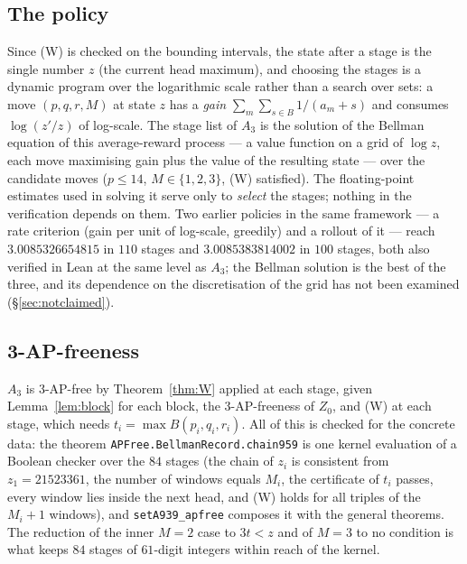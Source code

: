 \documentclass[11pt,a4paper]{article}
\theoremstyle{definition}
\theoremstyle{remark}
\newcommand{\Blk}{B}
\newcommand{\code}[1]{\texttt{#1}}
\begin{document}
\subsection{The policy}\label{sec:policy}

Since (W) is checked on the bounding intervals, the state after a stage is the single number $z$ (the current head maximum), and choosing the stages is a dynamic program over the logarithmic scale rather than a search over sets: a move $(p,q,r,M)$ at state $z$ has a \emph{gain} $\sum_m \sum_{s \in \Blk} 1/(a_m + s)$ and consumes $\log(z'/z)$ of log-scale. The stage list of $A_3$ is the solution of the Bellman equation of this average-reward process --- a value function on a grid of $\log z$, each move maximising gain plus the value of the resulting state --- over the candidate moves ($p \le 14$, $M \in \{1,2,3\}$, (W) satisfied). The floating-point estimates used in solving it serve only to \emph{select} the stages; nothing in the verification depends on them. Two earlier policies in the same framework --- a rate criterion (gain per unit of log-scale, greedily) and a rollout of it --- reach $3.0085326654815$ in $110$ stages and $3.0085383814002$ in $100$ stages, both also verified in Lean at the same level as $A_3$; the Bellman solution is the best of the three, and its dependence on the discretisation of the grid has not been examined (\S\ref{sec:notclaimed}).

\subsection{3-AP-freeness}\label{sec:apfree3}

$A_3$ is 3-AP-free by Theorem~\ref{thm:W} applied at each stage, given Lemma~\ref{lem:block} for each block, the 3-AP-freeness of $Z_0$, and (W) at each stage, which needs $t_i = \max \Blk(p_i,q_i,r_i)$. All of this is checked for the concrete data: the theorem \code{APFree.\allowbreak{}BellmanRecord.\allowbreak{}chain959} is one kernel evaluation of a Boolean checker over the $84$ stages (the chain of $z_i$ is consistent from $z_1 = 21523361$, the number of windows equals $M_i$, the certificate of $t_i$ passes, every window lies inside the next head, and (W) holds for all triples of the $M_i+1$ windows), and \code{setA939\_\allowbreak{}apfree} composes it with the general theorems. The reduction of the inner $M=2$ case to $3t < z$ and of $M=3$ to no condition is what keeps $84$ stages of $61$-digit integers within reach of the kernel.
\end{document}
